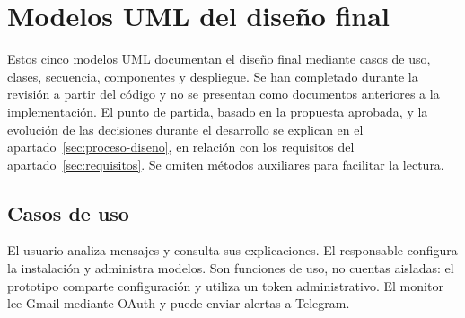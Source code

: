 \clearpage
\section{Modelos UML del diseño final}
\label{sec:uml}

Estos cinco modelos UML documentan el diseño final mediante casos de uso, clases, secuencia, componentes y despliegue. Se han completado durante la revisión a partir del código y no se presentan como documentos anteriores a la implementación. El punto de partida, basado en la propuesta aprobada, y la evolución de las decisiones durante el desarrollo se explican en el apartado~\ref{sec:proceso-diseno}, en relación con los requisitos del apartado~\ref{sec:requisitos}. Se omiten métodos auxiliares para facilitar la lectura.

\subsection{Casos de uso}
El usuario analiza mensajes y consulta sus explicaciones. El responsable configura la instalación y administra modelos. Son funciones de uso, no cuentas aisladas: el prototipo comparte configuración y utiliza un token administrativo. El monitor lee Gmail mediante OAuth y puede enviar alertas a Telegram.

